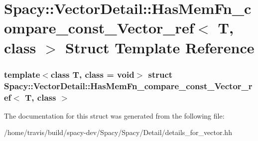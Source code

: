 \hypertarget{structSpacy_1_1VectorDetail_1_1HasMemFn__compare__const__Vector__ref}{\section{\-Spacy\-:\-:\-Vector\-Detail\-:\-:\-Has\-Mem\-Fn\-\_\-compare\-\_\-const\-\_\-\-Vector\-\_\-ref$<$ \-T, class $>$ \-Struct \-Template \-Reference}
\label{structSpacy_1_1VectorDetail_1_1HasMemFn__compare__const__Vector__ref}
}
\subsubsection*{template$<$class T, class = void$>$ struct Spacy\-::\-Vector\-Detail\-::\-Has\-Mem\-Fn\-\_\-compare\-\_\-const\-\_\-\-Vector\-\_\-ref$<$ T, class $>$}



\-The documentation for this struct was generated from the following file\-:\begin{DoxyCompactItemize}
\item 
/home/travis/build/spacy-\/dev/\-Spacy/\-Spacy/\-Detail/details\-\_\-for\-\_\-vector.\-hh\end{DoxyCompactItemize}
